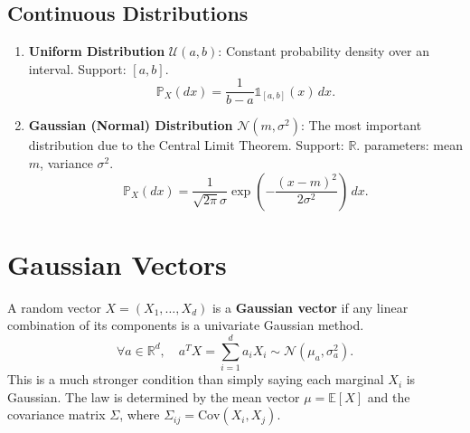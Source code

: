 \subsection{Continuous Distributions}
\begin{enumerate}
    \item \textbf{Uniform Distribution} $\mathcal{U}(a, b)$:
    Constant probability density over an interval.
    Support: $[a, b]$.
    \[
    \mathbb{P}_X(dx) = \frac{1}{b-a} \mathbb{1}_{[a, b]}(x) \, dx.
    \]
    
    \item \textbf{Gaussian (Normal) Distribution} $\mathcal{N}(m, \sigma^2)$:
    The most important distribution due to the Central Limit Theorem.
    Support: $\mathbb{R}$.
    parameters: mean $m$, variance $\sigma^2$.
    \[
    \mathbb{P}_X(dx) = \frac{1}{\sqrt{2\pi}\sigma} \exp\left( -\frac{(x-m)^2}{2\sigma^2} \right) \, dx.
    \]
\end{enumerate}

\section{Gaussian Vectors}
A random vector $X = (X_1, \dots, X_d)$ is a \textbf{Gaussian vector} if any linear combination of its components is a univariate Gaussian method.
\[
\forall a \in \mathbb{R}^d, \quad a^T X = \sum_{i=1}^d a_i X_i \sim \mathcal{N}(\mu_a, \sigma^2_a).
\]
This is a much stronger condition than simply saying each marginal $X_i$ is Gaussian.
The law is determined by the mean vector $\mu = \mathbb{E}[X]$ and the covariance matrix $\Sigma$, where $\Sigma_{ij} = \text{Cov}(X_i, X_j)$.
